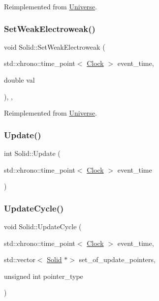 Reimplemented from \mbox{\hyperlink{classUniverse_a0f5cd04081b41ee931c0557dc397f6fb}{Universe}}.

\mbox{\label{classSolid_adb34befc66f8c681f3a85c44e0d00e3a}} 
\subsubsection{\texorpdfstring{Set\+Weak\+Electroweak()}{SetWeakElectroweak()}}
{\footnotesize\ttfamily void Solid\+::\+Set\+Weak\+Electroweak (\begin{DoxyParamCaption}\item[{std\+::chrono\+::time\+\_\+point$<$ \mbox{\hyperlink{universe_8h_a0ef8d951d1ca5ab3cfaf7ab4c7a6fd80}{Clock}} $>$}]{event\+\_\+time,  }\item[{double}]{val }\end{DoxyParamCaption})\hspace{0.3cm}{\ttfamily [inline]}, {\ttfamily [final]}, {\ttfamily [virtual]}}



Reimplemented from \mbox{\hyperlink{classUniverse_a2d3d642bfdc863248e93535832fa4b00}{Universe}}.

\mbox{\label{classSolid_a248a5eab9fa0c584af7cdec2f86dc3a3}} 
\subsubsection{\texorpdfstring{Update()}{Update()}}
{\footnotesize\ttfamily int Solid\+::\+Update (\begin{DoxyParamCaption}\item[{std\+::chrono\+::time\+\_\+point$<$ \mbox{\hyperlink{universe_8h_a0ef8d951d1ca5ab3cfaf7ab4c7a6fd80}{Clock}} $>$}]{event\+\_\+time }\end{DoxyParamCaption})}

\mbox{\label{classSolid_a17239817eba0e5870454311857dca736}} 
\subsubsection{\texorpdfstring{Update\+Cycle()}{UpdateCycle()}}
{\footnotesize\ttfamily void Solid\+::\+Update\+Cycle (\begin{DoxyParamCaption}\item[{std\+::chrono\+::time\+\_\+point$<$ \mbox{\hyperlink{universe_8h_a0ef8d951d1ca5ab3cfaf7ab4c7a6fd80}{Clock}} $>$}]{event\+\_\+time,  }\item[{std\+::vector$<$ \mbox{\hyperlink{classSolid}{Solid}} $\ast$$>$}]{set\+\_\+of\+\_\+update\+\_\+pointers,  }\item[{unsigned int}]{pointer\+\_\+type }\end{DoxyParamCaption})}



